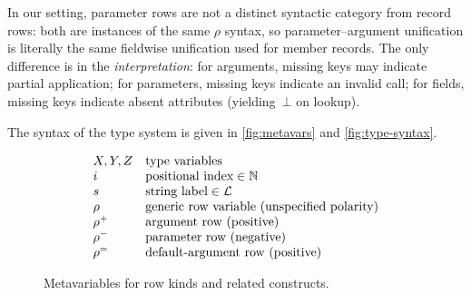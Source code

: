 \noindent
In our setting, parameter rows are not a distinct syntactic category from record rows: both are instances of the same $\rho$ syntax, so parameter–argument unification is literally the same fieldwise unification used for member records.  
The only difference is in the \emph{interpretation}:
for arguments, missing keys may indicate partial application;
for parameters, missing keys indicate an invalid call;
for fields, missing keys indicate absent attributes (yielding~$\bot$ on lookup).

The syntax of the type system is given in \autoref{fig:metavars} and \autoref{fig:type-syntax}.

\begin{figure}[t]
\centering
\[
\begin{array}{ll}
X, Y, Z & \text{type variables} \\
i & \text{positional index} \in \mathbb{N} \\
s & \text{string label} \in \mathcal{L} \\
\rho & \text{generic row variable (unspecified polarity)} \\
\mathord{\rho^{+}} & \text{argument row (positive)} \\
\mathord{\rho^{-}} & \text{parameter row (negative)} \\
\mathord{\rho^{=}} & \text{default-argument row (positive)}
\end{array}
\]
\caption{Metavariables for row kinds and related constructs.}
\label{fig:metavars}
\end{figure}

